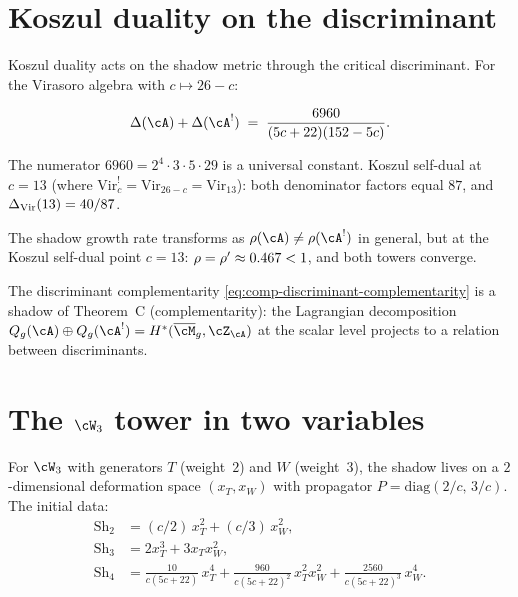 \section{Koszul duality on the discriminant}
\label{sec:comp-koszul-discriminant}

Koszul duality acts on the shadow metric through the critical
discriminant. For the Virasoro algebra with
$c \mapsto 26 - c$:

\begin{equation}\label{eq:comp-discriminant-complementarity}
 \CritDisc(\cA) + \CritDisc(\cA^!)
 \;=\; \frac{6960}{(5c+22)(152-5c)}.
\end{equation}

The numerator $6960 = 2^4 \cdot 3 \cdot 5 \cdot 29$ is a
universal constant. Koszul self-dual at $c = 13$ (where $\mathrm{Vir}_c^! = \mathrm{Vir}_{26-c} = \mathrm{Vir}_{13}$): both denominator
factors equal $87$, and
$\Delta_{\mathrm{Vir}}(13) = 40/87$.

The shadow growth rate transforms as
$\ShadowGrowth(\cA) \neq \ShadowGrowth(\cA^!)$ in general,
but at the Koszul self-dual point $c = 13$:
$\rho = \rho' \approx 0.467 < 1$,
and both towers converge.

The discriminant complementarity
\eqref{eq:comp-discriminant-complementarity} is a shadow of
Theorem~C (complementarity): the Lagrangian decomposition
$Q_g(\cA) \oplus Q_g(\cA^!) = H^*(\overline{\cM}_g, \cZ_\cA)$
at the scalar level projects to a relation between
discriminants.


\section{The $\cW_3$ tower in two variables}
\label{sec:comp-w3-tower}

For $\cW_3$ with generators $T$ (weight~$2$) and
$W$ (weight~$3$), the shadow lives on a $2$-dimensional
deformation space $(x_T, x_W)$ with propagator
$P = \mathrm{diag}(2/c,\, 3/c)$. The initial data:
\begin{align*}
\mathrm{Sh}_2 &= (c/2)\,x_T^2 + (c/3)\,x_W^2, \\
\mathrm{Sh}_3 &= 2x_T^3 + 3 x_T x_W^2, \\
\mathrm{Sh}_4 &= \tfrac{10}{c(5c{+}22)}\,x_T^4
 + \tfrac{960}{c(5c{+}22)^2}\,x_T^2 x_W^2
 + \tfrac{2560}{c(5c{+}22)^3}\,x_W^4.
\end{align*}


